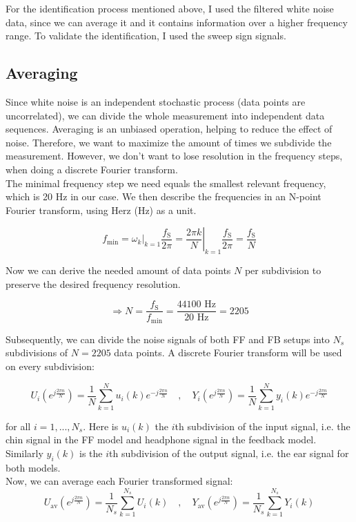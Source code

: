 For the identification process mentioned above, I used the filtered white noise data, since we can average it and it contains information over a higher frequency range. To validate the identification, I used the sweep sign signals.

\subsection{Averaging}

Since white noise is an independent stochastic process (data points are uncorrelated), we can divide the whole measurement into independent data sequences. Averaging is an unbiased operation, helping to reduce the effect of noise. Therefore, we want to maximize the amount of times we subdivide the measurement. However, we don't want to lose resolution in the frequency steps, when doing a discrete Fourier transform.\\

The minimal frequency step we need equals the smallest relevant frequency, which is 20 Hz in our case. We then describe the frequencies in an N-point Fourier transform, using Herz (Hz) as a unit.

\[ f_\text{min} =\left. \omega_k\right|_{k = 1}\frac{f_\text{S}}{2\pi} = \left. \frac{2\pi k}{N}\right|_{k = 1}\frac{f_\text{S}}{2\pi} = \frac{f_\text{S}}{N} \]

Now we can derive the needed amount of data points $N$ per subdivision to preserve the desired frequency resolution.

\[\Rightarrow N = \frac{f_\text{S}}{f_\text{min}} = \frac{44100 \text{ Hz}}{20 \text{ Hz}} = 2205\]
 
Subsequently, we can divide the noise signals of both FF and FB setups into $N_s$ subdivisions of $N = 2205$ data points. A discrete Fourier transform will be used on every subdivision:

\[U_i(e^{j\frac{2\pi n}{N}}) = \frac{1}{N}\sum\limits_{k = 1}^{N }u_i(k)e^{-j\frac{2\pi n}{N}} \quad, \quad Y_i(e^{j\frac{2\pi n}{N}}) = \frac{1}{N}\sum\limits_{k = 1}^{N }y_i(k)e^{-j\frac{2\pi n}{N}}\]

for all $i = 1, ..., N_s$. Here is $u_i(k)$ the $i$th subdivision of the input signal, i.e. the chin signal in the FF model and headphone signal in the feedback model. Similarly $y_i(k)$ is the $i$th subdivision of the output signal, i.e. the ear signal for both models. \\

Now, we can average each Fourier transformed signal:
\[U_\text{av}(e^{j\frac{2\pi n}{N}}) = \frac{1}{N_s}\sum\limits_{k = 1}^{N_s }U_i(k) \quad, \quad Y_\text{av}(e^{j\frac{2\pi n}{N}}) = \frac{1}{N_s}\sum\limits_{k = 1}^{N_s} Y_i(k)\]

